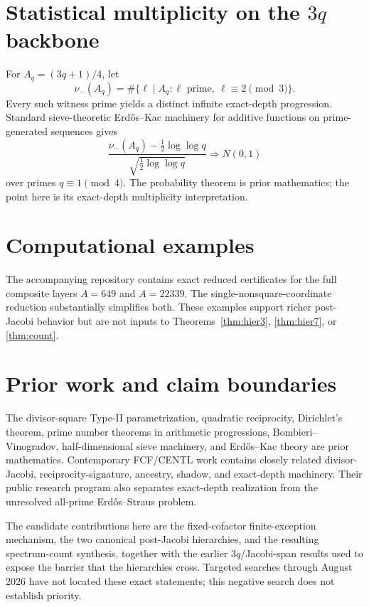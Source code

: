 \documentclass[11pt]{article}
\theoremstyle{definition}
\begin{document}
\section{Statistical multiplicity on the $3q$ backbone}
For $A_q=(3q+1)/4$, let
\[
\nu_-(A_q)=\#\{\ell\mid A_q:\ell\text{ prime},\ \ell\equiv2\pmod3\}.
\]
Every such witness prime yields a distinct infinite exact-depth progression. Standard sieve-theoretic Erd\H{o}s--Kac machinery for additive functions on prime-generated sequences gives
\[
\frac{\nu_-(A_q)-\frac12\log\log q}
{\sqrt{\frac12\log\log q}}
\Longrightarrow N(0,1)
\]
over primes $q\equiv1\pmod4$. The probability theorem is prior mathematics; the point here is its exact-depth multiplicity interpretation.

\section{Computational examples}
The accompanying repository contains exact reduced certificates for the full composite layers $A=649$ and $A=22339$. The single-nonsquare-coordinate reduction substantially simplifies both. These examples support richer post-Jacobi behavior but are not inputs to Theorems~\ref{thm:hier3}, \ref{thm:hier7}, or \ref{thm:count}.

\section{Prior work and claim boundaries}
The divisor-square Type-II parametrization, quadratic reciprocity, Dirichlet's theorem, prime number theorems in arithmetic progressions, Bombieri--Vinogradov, half-dimensional sieve machinery, and Erd\H{o}s--Kac theory are prior mathematics. Contemporary FCF/CENTL work contains closely related divisor-Jacobi, reciprocity-signature, ancestry, shadow, and exact-depth machinery. Their public research program also separates exact-depth realization from the unresolved all-prime Erd\H{o}s--Straus problem.

The candidate contributions here are the fixed-cofactor finite-exception mechanism, the two canonical post-Jacobi hierarchies, and the resulting spectrum-count synthesis, together with the earlier $3q$/Jacobi-span results used to expose the barrier that the hierarchies cross. Targeted searches through August 2026 have not located these exact statements; this negative search does not establish priority.
\end{document}
